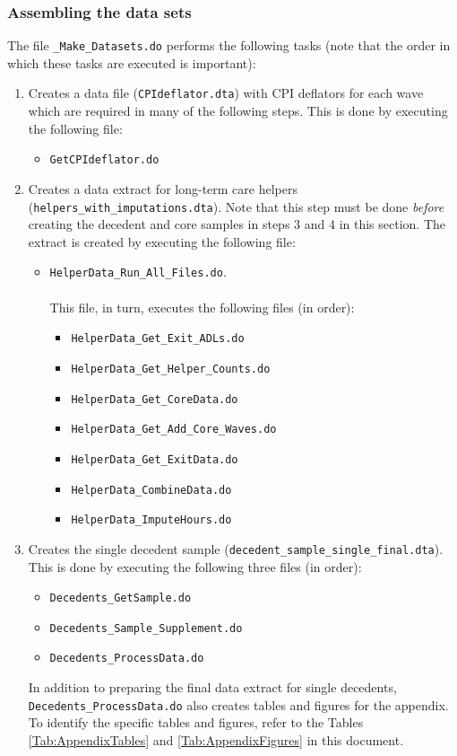 \documentclass[a4,12p]{article}
\begin{document}
\subsubsection{Assembling the data sets}

The file {\tt \_Make\_Datasets.do} performs the following tasks (note that the order in which these tasks are executed is important):

\begin{enumerate}

\item
Creates a data file ({\tt CPIdeflator.dta}) with CPI deflators for each wave which are required in many of the following steps. This is done by executing the following file:
\begin{itemize}
\item {\tt GetCPIdeflator.do}
\end{itemize}

\item 
Creates a data extract for long-term care helpers ({\tt helpers\_with\_imputations.dta}). Note that this step must be done \emph{before} creating the decedent and core samples in steps 3 and 4 in this section. The extract is created by executing the following file:
\begin{itemize}
\item  {\tt HelperData\_Run\_All\_Files.do}. \\
\\
This file, in turn, executes the following files (in order):
\begin{itemize}
  \item {\tt HelperData\_Get\_Exit\_ADLs.do}
  \item {\tt HelperData\_Get\_Helper\_Counts.do}
  \item {\tt HelperData\_Get\_CoreData.do}
  \item {\tt HelperData\_Get\_Add\_Core\_Waves.do}
  \item {\tt HelperData\_Get\_ExitData.do}
  \item {\tt HelperData\_CombineData.do}
  \item {\tt HelperData\_ImputeHours.do}
\end{itemize}
\end{itemize}

\item 
Creates the single decedent sample ({\tt decedent\_sample\_single\_final.dta}). This is done by executing the following three files (in order):
\begin{itemize} 
  \item {\tt Decedents\_GetSample.do}
  \item {\tt Decedents\_Sample\_Supplement.do}
  \item {\tt Decedents\_ProcessData.do}
\end{itemize}
In addition to preparing the final data extract for single decedents, {\tt Decedents\_ProcessData.do} also creates tables and figures for the appendix. To identify the specific tables and figures, refer to the Tables \ref{Tab:AppendixTables} and \ref{Tab:AppendixFigures} in this document.


\end{enumerate}
\end{document}
